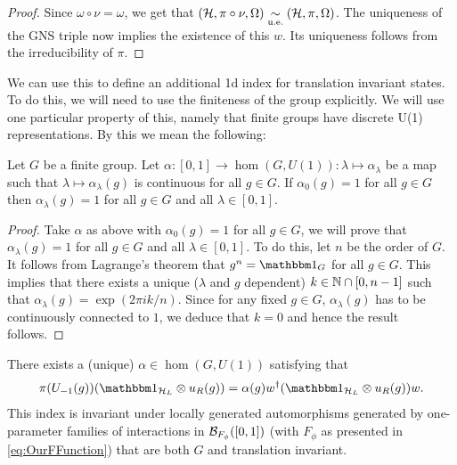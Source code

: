 \documentclass[11pt,a4paper,twoside]{article}
\numberwithin{equation}{section}
\begin{document}
	\begin{proof}
		Since $\omega\circ\nu=\omega$, we get that $(\mathcal H,\pi\circ\nu,\Omega)\underset{\text{u.e.}}{\sim} (\mathcal H,\pi,\Omega)$. The uniqueness of the GNS triple now implies the existence of this $w$. Its uniqueness follows from the irreducibility of $\pi$.
	\end{proof}
	We can use this to define an additional 1d index for translation invariant states. To do this, we will need to use the finiteness of the group explicitly. We will use one particular property of this, namely that finite groups have discrete U(1) representations. By this we mean the following:
	\begin{lemma}\label{lem:FiniteGroupsHaveDiscreteU(1)Representations}
		Let $G$ be a finite group. Let $\alpha:[0,1]\rightarrow\hom(G,U(1)):\lambda\mapsto \alpha_\lambda$ be a map such that $\lambda\mapsto\alpha_\lambda(g)$ is continuous for all $g\in G$. If $\alpha_0(g)=1$ for all $g\in G$ then $\alpha_\lambda(g)=1$ for all $g\in G$ and all $\lambda\in[0,1]$.
	\end{lemma}
	\begin{proof}
		 Take $\alpha$ as above with $\alpha_0(g)=1$ for all $g\in G$, we will prove that $\alpha_\lambda(g)=1$ for all $g\in G$ and all $\lambda\in[0,1]$. To do this, let $n$ be the order of $G$. It follows from Lagrange's theorem that $g^n=\id_G$ for all $g\in G$. This implies that there exists a unique ($\lambda$ and $g$ dependent) $k\in\mathbb{N}\cap [0,n-1]$ such that $\alpha_\lambda(g)=\exp(2\pi ik/n)$. Since for any fixed $g\in G$,  $\alpha_\lambda(g)$ has to be continuously connected to $1$, we deduce that $k=0$ and hence the result follows.
	\end{proof}
	\begin{lemma}
		There exists a (unique) $\alpha\in\hom(G,U(1))$ satisfying that
		\begin{equation}
			\pi(U_{-1}(g)) (\id_{\HH_L}\otimes u_R(g))=\alpha(g)w^\dagger(\id_{\HH_L}\otimes u_R(g)) w.
		\end{equation}
		This index is invariant under locally generated automorphisms generated by one-parameter families of interactions in $\mathcal B_{F_\phi}([0,1])$ (with $F_\phi$ as presented in \eqref{eq:OurFFunction}) that are both $G$ and translation invariant.
	\end{lemma}
\end{document}
